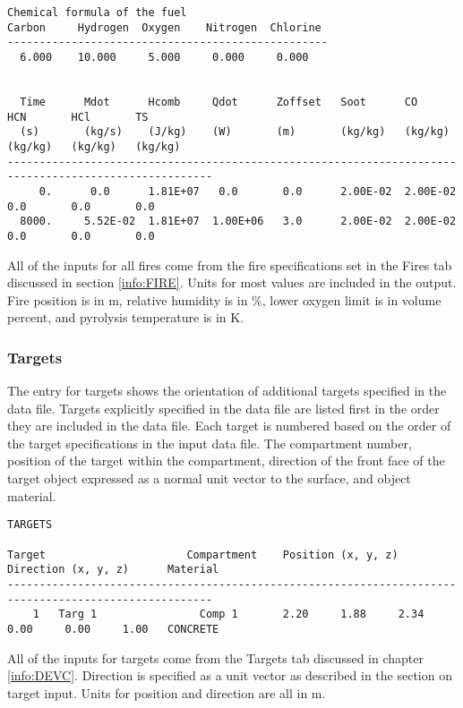 \begin{lstlisting}[basicstyle=\tiny]
Chemical formula of the fuel
Carbon     Hydrogen  Oxygen    Nitrogen  Chlorine
--------------------------------------------------
  6.000    10.000     5.000     0.000     0.000


  Time      Mdot      Hcomb     Qdot      Zoffset   Soot      CO        HCN       HCl       TS
  (s)       (kg/s)    (J/kg)    (W)       (m)       (kg/kg)   (kg/kg)   (kg/kg)   (kg/kg)   (kg/kg)
------------------------------------------------------------------------------------------------------
     0.      0.0      1.81E+07   0.0       0.0      2.00E-02  2.00E-02   0.0       0.0       0.0
  8000.     5.52E-02  1.81E+07  1.00E+06   3.0      2.00E-02  2.00E-02   0.0       0.0       0.0
\end{lstlisting}
All of the inputs for all fires come from the fire specifications set in the Fires tab discussed in section \ref{info:FIRE}.  Units for most values are included in the output.  Fire position is in m, relative humidity is in \%, lower oxygen limit is in volume percent, and pyrolysis temperature is in K.


\subsubsection{Targets}

The entry for targets shows the orientation of additional targets specified in the data file. Targets explicitly specified in the data file are listed first in the order they are included in the data file.  Each target is numbered based on the order of the target specifications in the input data file.  The compartment number, position of the target within the compartment, direction of the front face of the target object expressed as a normal unit vector to the surface, and object material.

\begin{lstlisting}[basicstyle=\tiny]
TARGETS

Target                      Compartment    Position (x, y, z)         Direction (x, y, z)      Material
------------------------------------------------------------------------------------------------------
    1   Targ 1                Comp 1       2.20     1.88     2.34     0.00     0.00     1.00   CONCRETE
\end{lstlisting}

All of the inputs for targets come from the Targets tab discussed in chapter \ref{info:DEVC}. Direction is specified as a unit vector as described in the section on target input. Units for position and direction are all in m.

